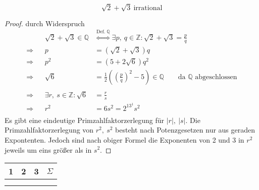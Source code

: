 \documentclass[a4paper, 12pt]{scrartcl}
\newcommand{\defImpl}[1]{\stackrel{\text{Def.}\;#1}{\Longleftrightarrow}}
\begin{document}
\begin{theorem}
	\[ \sqrt{2} + \sqrt{3}\ \text{irrational} \]
\end{theorem}
\begin{proof} durch Widerspruch\\
\begin{align*}
	&&\sqrt{2} + \sqrt{3} \in \mathbb{Q} &\defImpl{\mathbb{Q}} \exists p,\ q \in \mathbb{Z} : \sqrt{2} + \sqrt{3} = \frac{p}{q} \\
	\Rightarrow&& p &= (\sqrt{2} + \sqrt{3})q \\
	\Rightarrow&& p^2 &= (5+2\sqrt{6})q^2 \\
	\Rightarrow&& \sqrt{6} &= \frac{1}{2}\left( \left( \frac{p}{q} \right)^2 - 5 \right)  \in \mathbb{Q} \qquad \text{da $\mathbb{Q}$ abgeschlossen} \\
	\\
	\Rightarrow&& \exists r,\ s \in \mathbb{Z} : \sqrt{6} &= \frac{r}{s} \\
	\Rightarrow&& r^2 &= 6s^2 = 2^13^1s^2 \\ 
\end{align*}
Es gibt eine eindeutige Primzahlfaktorzerlegung für $|r|,\ |s|$. Die Primzahlfaktorzerlegung von $r^2,\ s^2$ besteht nach Potenzgesetzen nur aus geraden Expontenten. Jedoch sind nach obiger Formel die Exponenten von 2 und 3 in $r^2$ jeweils um eins größer als in $s^2$. \Large\Lightning
\end{proof}
\vfill
\begin{flushright}
	\begin{tabular}{c|c|c|c}
	1 & 2 & 3 & $\Sigma$ \\
	\hline
	\hspace*{4em}& \hspace*{4em}& \hspace*{4em}&\hspace*{4em} \\
	&&&\\
	\end{tabular}
\end{flushright}
\end{document}
